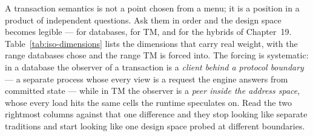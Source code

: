 A transaction semantics is not a point chosen from a menu; it is a position in
a product of independent questions. Ask them in order and the design space
becomes legible --- for databases, for TM, and for the hybrids of
Chapter~19. Table~\ref{tab:iso-dimensions} lists the dimensions that carry
real weight, with the range databases chose and the range TM is forced
into. The forcing is systematic: in a database the observer of a transaction
is a \emph{client behind a protocol boundary} --- a separate process whose
every view is a request the engine answers from committed state --- while in
TM the observer is a \emph{peer inside the address space}, whose every load
hits the same cells the runtime speculates on. Read the two rightmost columns
against that one difference and they stop looking like separate traditions
and start looking like one design space probed at different boundaries.

